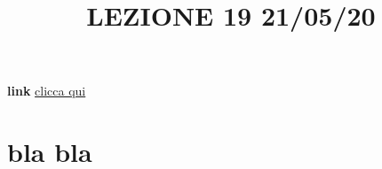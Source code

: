 \title{LEZIONE 19 21/05/20}
\textbf{link} \href{https://web.microsoftstream.com/video/9329ad3d-c8a8-48ab-b415-668ff6193e36?list=user&userId=cfe0965d-9a7c-40e2-be6e-f078296a1914}{clicca qui}
\section{bla bla}